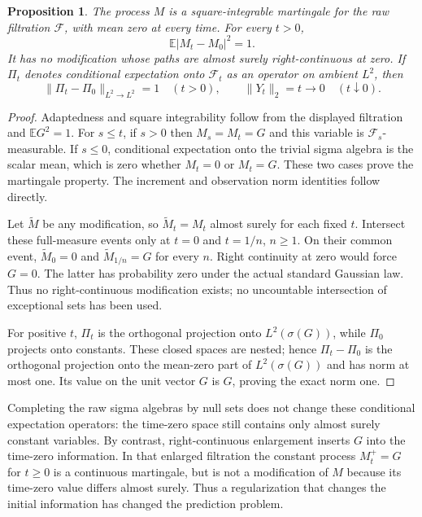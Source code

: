 \documentclass[11pt]{article}
\newtheorem{proposition}[theorem]{Proposition}
\begin{document}
\begin{proposition}\label{prop:rawarrival}
The process $M$ is a square-integrable martingale for the raw
filtration $\mathcal F$, with mean zero at every time. For every
$t>0$,
\[
 \mathbb E|M_t-M_0|^2=1.
\]
It has no modification whose paths are almost surely right-continuous
at zero. If $\Pi_t$ denotes conditional expectation onto
$\mathcal F_t$ as an operator on ambient $L^2$, then
\[
 \|\Pi_t-\Pi_0\|_{L^2\to L^2}=1\quad(t>0),
 \qquad \|Y_t\|_2=t\longrightarrow0\quad(t\downarrow0).
\]
\end{proposition}
\begin{proof}
Adaptedness and square integrability follow from the displayed
filtration and $\mathbb E G^2=1$. For $s\leq t$, if $s>0$ then
$M_s=M_t=G$ and this variable is $\mathcal F_s$-measurable.
If $s\leq0$, conditional expectation onto the trivial sigma algebra
is the scalar mean, which is zero whether $M_t=0$ or $M_t=G$.
These two cases prove the martingale property. The increment and
observation norm identities follow directly.

Let $\widetilde M$ be any modification, so
$\widetilde M_t=M_t$ almost surely for each fixed $t$.
Intersect these full-measure events only at $t=0$ and $t=1/n$,
$n\geq1$. On their common event,
$\widetilde M_0=0$ and $\widetilde M_{1/n}=G$ for every $n$.
Right continuity at zero would force $G=0$. The latter has probability
zero under the actual standard Gaussian law. Thus no right-continuous
modification exists; no uncountable intersection of exceptional sets
has been used.

For positive $t$, $\Pi_t$ is the orthogonal projection onto
$L^2(\sigma(G))$, while $\Pi_0$ projects onto constants. These
closed spaces are nested; hence $\Pi_t-\Pi_0$ is the orthogonal
projection onto the mean-zero part of $L^2(\sigma(G))$ and has
norm at most one. Its value on the unit vector $G$ is $G$, proving
the exact norm one.
\end{proof}

Completing the raw sigma algebras by null sets does not change these
conditional expectation operators: the time-zero space still contains
only almost surely constant variables. By contrast, right-continuous
enlargement inserts $G$ into the time-zero information. In that enlarged
filtration the constant process $M_t^+=G$ for $t\geq0$ is a continuous
martingale, but is not a modification of $M$ because its time-zero
value differs almost surely. Thus a regularization that changes the
initial information has changed the prediction problem.
\end{document}
